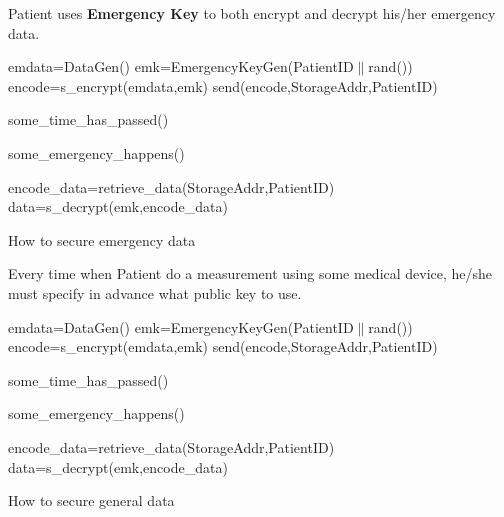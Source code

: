 \documentclass[]{scrartcl}
\theoremstyle{definition}
\begin{document}
Patient uses \textbf{Emergency Key} to both encrypt and decrypt his/her emergency data.

\begin{algorithm}[H]
\SetAlgoLined
{}
	emdata=DataGen()\;
	emk=EmergencyKeyGen(PatientID$\|$rand())\;
	encode=s\_encrypt(emdata,emk)\;
	send(encode,StorageAddr,PatientID)\;

	some\_time\_has\_passed()\;

	some\_emergency\_happens()\;

	encode\_data=retrieve\_data(StorageAddr,PatientID)\;
	data=s\_decrypt(emk,encode\_data)\;



\caption{How to secure emergency data}

\end{algorithm}


Every time when Patient do a measurement using some medical device, he/she must specify in advance what public key to use.

\begin{algorithm}[H]
\SetAlgoLined
{}
	emdata=DataGen()\;
	emk=EmergencyKeyGen(PatientID$\|$rand())\;
	encode=s\_encrypt(emdata,emk)\;
	send(encode,StorageAddr,PatientID)\;

	some\_time\_has\_passed()\;

	some\_emergency\_happens()\;

	encode\_data=retrieve\_data(StorageAddr,PatientID)\;
	data=s\_decrypt(emk,encode\_data)\;



\caption{How to secure general data}

\end{algorithm}


\end{document}
